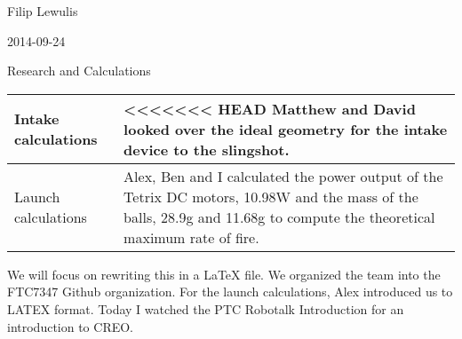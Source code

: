 Filip Lewulis

2014-09-24

Research and Calculations

\begin{tabular}{|p{5cm}|p{5cm}|}
  \hline
Intake calculations
  &
<<<<<<< HEAD
Matthew and David looked over the ideal geometry for the intake device to the slingshot.
\\
\hline
Launch calculations
  &
Alex, Ben and I calculated the power output of the Tetrix DC motors, 10.98W and the mass of the balls, 28.9g and 11.68g to compute the theoretical maximum rate of fire.
\\
  \hline
\end{tabular}
We will focus on rewriting this in a LaTeX file.
We organized the team into the FTC7347 Github organization. For the launch calculations,
Alex introduced us to LATEX format. Today I watched the PTC Robotalk Introduction for
an introduction to CREO.
